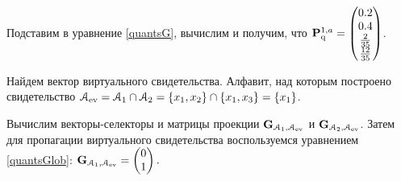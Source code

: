 Подставим в уравнение \ref{quantsG}, вычислим и получим, что $\mathbf{P}_\mathrm{q}^{1,a} = \begin{pmatrix}
0.2 \\ 0.4 \\  \frac{2}{35}\\ \frac{12}{35}
\end{pmatrix}$.

Найдем вектор виртуального свидетельства. Алфавит, над которым построено свидетельство $\mathcal{A}_{\mathrm{ev}} = \mathcal{A}_1 \cap \mathcal{A}_2 = \{x_1, x_2\} \cap \{x_1, x_3\} = \{x_1\}$.

Вычислим векторы-селекторы и матрицы проекции $\mathbf{G}_{\mathcal{A}_1, \mathcal{A}_{\mathrm{ev}}}$ и $\mathbf{G}_{\mathcal{A}_2, \mathcal{A}_{\mathrm{ev}}}$. Затем для пропагации виртуального свидетельства воспользуемся уравнением \ref{quantsGlob}: $\mathbf{G}_{\mathcal{A}_1, \mathcal{A}_{\mathrm{ev}}} = \begin{pmatrix} 0 \\ 1\end{pmatrix}.$

